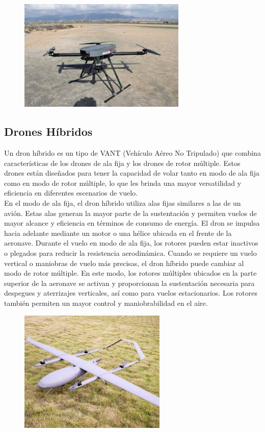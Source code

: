 \documentclass{article}
\begin{document}
\begin{figure}[h]
  \includegraphics[width=8cm]{images/multi_rotor.jpg}
  \centering
\end{figure}

\subsection{Drones Híbridos}

Un dron híbrido es un tipo de VANT (Vehículo Aéreo No Tripulado) que combina características de los drones de ala fija y los drones de rotor múltiple. Estos drones están diseñados para tener la capacidad de volar tanto en modo de ala fija como en modo de rotor múltiple, lo que les brinda una mayor versatilidad y eficiencia en diferentes escenarios de vuelo.\\

En el modo de ala fija, el dron híbrido utiliza alas fijas similares a las de un avión. Estas alas generan la mayor parte de la sustentación y permiten vuelos de mayor alcance y eficiencia en términos de consumo de energía. El dron se impulsa hacia adelante mediante un motor o una hélice ubicada en el frente de la aeronave. Durante el vuelo en modo de ala fija, los rotores pueden estar inactivos o plegados para reducir la resistencia aerodinámica. Cuando se requiere un vuelo vertical o maniobras de vuelo más precisas, el dron híbrido puede cambiar al modo de rotor múltiple. En este modo, los rotores múltiples ubicados en la parte superior de la aeronave se activan y proporcionan la sustentación necesaria para despegues y aterrizajes verticales, así como para vuelos estacionarios. Los rotores también permiten un mayor control y maniobrabilidad en el aire.\\

\begin{figure}[h]
  \includegraphics[width=7cm]{images/hybrid_drone.jpg}
  \centering
\end{figure}
\end{document}
